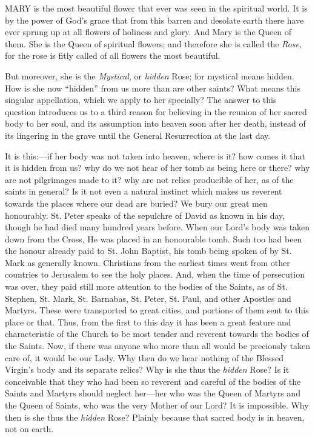 

MARY
is the most beautiful flower that ever was seen in the spiritual world.
It is by the power of God's grace that from this barren and desolate
earth there have ever sprung up at all flowers of holiness and glory.
And Mary is the Queen of them. She is the Queen of spiritual flowers;
and therefore she is called the \emph{Rose}, for the rose is fitly
called of all flowers the most beautiful.

But moreover, she is the \emph{Mystical},
or \emph{hidden} Rose; for mystical means hidden. How is she now ``hidden''
from us more than are other saints? What means this singular
appellation, which we apply to her specially? The answer to this
question introduces us to a third reason for believing in the reunion of
her sacred body to her soul, and its assumption into heaven soon after
her death, instead of its lingering in the grave until the General
Resurrection at the last day.

It is this:—if her body was
not taken into heaven, where is it? how comes it that it is hidden from
us? why do we not hear of her tomb as being here or there? why are
not pilgrimages made to it? why are not relics producible of her, as of
the saints in general? Is it not even a natural instinct which makes us
reverent towards the places where our dead are buried? We bury our great
men honourably. St. Peter speaks of the sepulchre of David as known in
his day, though he had died many hundred years before. When our Lord's
body was taken down from the Cross, He was placed in an honourable tomb.
Such too had been the honour already paid to St. John Baptist, his tomb
being spoken of by St. Mark as generally known. Christians from the
earliest times went from other countries to Jerusalem to see the holy
places. And, when the time of persecution was over, they paid still more
attention to the bodies of the Saints, as of St. Stephen, St. Mark, St.
Barnabas, St. Peter, St. Paul, and other Apostles and Martyrs. These
were transported to great cities, and portions of them sent to this
place or that. Thus, from the first to this day it has been a great
feature and characteristic of the Church to be most tender and reverent
towards the bodies of the Saints. Now, if there was anyone who more than
all would be preciously taken care of, it would be our Lady. Why then do
we hear nothing of the Blessed Virgin's body and its separate relics?
Why is she thus the \emph{hidden} Rose? Is it conceivable that they who
had been so reverent and careful of the bodies of the Saints and Martyrs
should neglect her—her who was the Queen of Martyrs and the Queen of
Saints, who was the very Mother of our Lord? It is impossible. Why then
is she thus the \emph{hidden} Rose? Plainly because that sacred body is
in heaven, not on earth.

